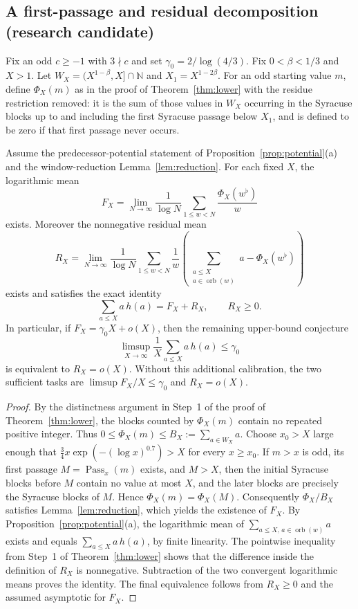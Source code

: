 \subsection*{A first-passage and residual decomposition (research candidate)}
\label{subsec:residual}
Fix an odd $c\ge-1$ with $3\nmid c$ and set
$\gamma_0=2/\log(4/3)$. Fix $0<\beta<1/3$ and $X>1$.
Let $W_X=(X^{1-\beta},X]\cap\mathbb N$ and
$X_1=X^{1-2\beta}$. For an odd starting value $m$, define
$\Phi_X(m)$ as in the proof of Theorem~\ref{thm:lower}
with the residue restriction removed: it is the sum of those values
in $W_X$ occurring in the Syracuse blocks up to and including the
first Syracuse passage below $X_1$, and is defined to be zero if
that first passage never occurs.

\begin{proposition}
\label{prop:residual_decomposition}
Assume the predecessor-potential statement of
Proposition~\ref{prop:potential}(a) and the window-reduction
Lemma~\ref{lem:reduction}. For each fixed $X$, the logarithmic mean
\[
 F_X=\lim_{N\to\infty}\frac1{\log N}
 \sum_{1\le w<N}\frac{\Phi_X(w^\flat)}{w}
\]
exists. Moreover the nonnegative residual mean
\[
 R_X=\lim_{N\to\infty}\frac1{\log N}
 \sum_{1\le w<N}\frac1w
 \left(\sum_{\substack{a\le X\\a\in\operatorname{orb}(w)}}a
       -\Phi_X(w^\flat)\right)
\]
exists and satisfies the exact identity
\[
 \boxed{\sum_{a\le X}a\,h(a)=F_X+R_X,\qquad R_X\ge0.}
\]
In particular, if $F_X=\gamma_0X+o(X)$, then the remaining
upper-bound conjecture
\[
 \limsup_{X\to\infty}\frac1X\sum_{a\le X}a\,h(a)
 \le\gamma_0
\]
is equivalent to $R_X=o(X)$. Without this additional calibration,
the two sufficient tasks are
$\limsup F_X/X\le\gamma_0$ and $R_X=o(X)$.
\end{proposition}

\begin{proof}
By the distinctness argument in Step~1 of the proof of
Theorem~\ref{thm:lower}, the blocks counted by $\Phi_X(m)$
contain no repeated positive integer. Thus
$0\le\Phi_X(m)\le B_X:=\sum_{a\in W_X}a$.
Choose $x_0>X$ large enough that
$\tfrac34 x\exp(-(\log x)^{0.7})>X$ for every $x\ge x_0$.
If $m>x$ is odd, its first passage $M=\operatorname{Pass}_x(m)$
exists, and $M>X$, then the initial Syracuse blocks before $M$
contain no value at most $X$, and the later blocks are precisely the
Syracuse blocks of $M$. Hence $\Phi_X(m)=\Phi_X(M)$.
Consequently $\Phi_X/B_X$ satisfies
Lemma~\ref{lem:reduction}, which yields the existence of $F_X$.
By Proposition~\ref{prop:potential}(a), the logarithmic mean of
$\sum_{a\le X,\,a\in\operatorname{orb}(w)}a$ exists and equals
$\sum_{a\le X}a\,h(a)$, by finite linearity. The pointwise
inequality from Step~1 of Theorem~\ref{thm:lower}
shows that the difference inside the definition of $R_X$ is
nonnegative. Subtraction of the two convergent logarithmic means
proves the identity. The final equivalence follows from
$R_X\ge0$ and the assumed asymptotic for $F_X$.
\end{proof}

